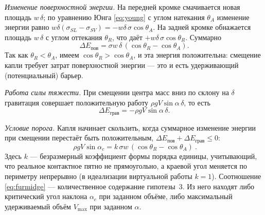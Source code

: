 \documentclass[11pt]{article}
\newcommand{\thA}{\theta_{A}}
\newcommand{\thR}{\theta_{R}}
\theoremstyle{definition}
\begin{document}
\emph{Изменение поверхностной энергии.} На передней кромке смачивается новая
площадь $w\,\delta$; по уравнению Юнга \eqref{eq:young} с углом натекания $\thA$
изменение энергии равно $w\delta(\sigma_{SL}-\sigma_{SV})=-w\delta\,\sigma\cos\thA$.
На задней кромке обнажается площадь $w\,\delta$ с углом оттекания $\thR$, что даёт
$+w\delta\,\sigma\cos\thR$. Суммарно
\begin{equation}
\Delta E_{\text{пов}}=\sigma w\,\delta\,(\cos\thR-\cos\thA).
\label{eq:dEsurf}
\end{equation}
Так как $\thR<\thA$, имеем $\cos\thR>\cos\thA$, и эта энергия положительна:
смещение капли требует затрат поверхностной энергии --- это и есть удерживающий
(потенциальный) барьер.

\emph{Работа силы тяжести.} При смещении центра масс вниз по склону на $\delta$
гравитация совершает положительную работу $\rho g V\sin\alpha\,\delta$, то есть
\begin{equation}
\Delta E_{\text{грав}}=-\rho g V\sin\alpha\,\delta .
\label{eq:dEgrav}
\end{equation}

\emph{Условие порога.} Капля начинает скользить, когда суммарное изменение энергии
при смещении перестаёт быть положительным, $\Delta E_{\text{пов}}+\Delta E_{\text{грав}}\le 0$:
\begin{equation}
\boxed{\ \rho g V\sin\alpha_{c}=k\,\sigma w\,(\cos\thR-\cos\thA)\ }.
\label{eq:furmidge}
\end{equation}
Здесь $k$ --- безразмерный коэффициент формы порядка единицы, учитывающий, что
реальное контактное пятно не прямоугольно, а краевой угол меняется по периметру
непрерывно (в идеализации виртуальной работы $k=1$). Соотношение
\eqref{eq:furmidge} --- количественное содержание гипотезы~3. Из него находят либо
критический угол наклона $\alpha_{c}$ при заданном объёме, либо максимальный
удерживаемый объём $V_{\max}$ при заданном $\alpha$.
\end{document}
